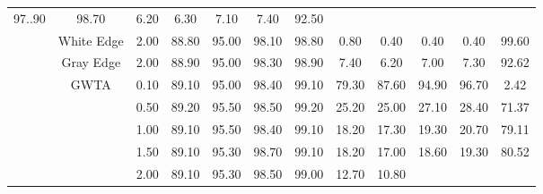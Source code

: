 \begin{table}[htbp]
{\begin{tabular}{cc|c|ccccccccc}
  \multicolumn{1}{c|}{97..90} &
  \multicolumn{1}{c|}{98.70} &
  \multicolumn{1}{c|}{6.20} &
  \multicolumn{1}{c|}{6.30} &
  \multicolumn{1}{c|}{7.10} &
  \multicolumn{1}{c|}{7.40} &
  92.50 \\ \cline{2-12} 
\multicolumn{1}{c|}{} &
  White Edge &
  2.00 &
  \multicolumn{1}{c|}{88.80} &
  \multicolumn{1}{c|}{95.00} &
  \multicolumn{1}{c|}{98.10} &
  \multicolumn{1}{c|}{98.80} &
  \multicolumn{1}{c|}{0.80} &
  \multicolumn{1}{c|}{0.40} &
  \multicolumn{1}{c|}{0.40} &
  \multicolumn{1}{c|}{0.40} &
  99.60 \\ \cline{2-12} 
\multicolumn{1}{c|}{} &
  Gray Edge &
  2.00 &
  \multicolumn{1}{c|}{88.90} &
  \multicolumn{1}{c|}{95.00} &
  \multicolumn{1}{c|}{98.30} &
  \multicolumn{1}{c|}{98.90} &
  \multicolumn{1}{c|}{7.40} &
  \multicolumn{1}{c|}{6.20} &
  \multicolumn{1}{c|}{7.00} &
  \multicolumn{1}{c|}{7.30} &
  92.62 \\ \cline{2-12} 
\multicolumn{1}{c|}{} &
  \multirow{9}{*}{GWTA}&
  0.10 &
  \multicolumn{1}{c|}{89.10} &
  \multicolumn{1}{c|}{95.00} &
  \multicolumn{1}{c|}{98.40} &
  \multicolumn{1}{c|}{99.10} &
  \multicolumn{1}{c|}{79.30} &
  \multicolumn{1}{c|}{87.60} &
  \multicolumn{1}{c|}{94.90} &
  \multicolumn{1}{c|}{96.70} &
  2.42 \\ \cline{3-12} 
\multicolumn{1}{c|}{} &
   &
  0.50 &
  \multicolumn{1}{c|}{89.20} &
  \multicolumn{1}{c|}{95.50} &
  \multicolumn{1}{c|}{98.50} &
  \multicolumn{1}{c|}{99.20} &
  \multicolumn{1}{c|}{25.20} &
  \multicolumn{1}{c|}{25.00} &
  \multicolumn{1}{c|}{27.10} &
  \multicolumn{1}{c|}{28.40} &
  71.37 \\ \cline{3-12} 
\multicolumn{1}{c|}{} &
   &
  1.00 &
  \multicolumn{1}{c|}{89.10} &
  \multicolumn{1}{c|}{95.50} &
  \multicolumn{1}{c|}{98.40} &
  \multicolumn{1}{c|}{99.10} &
  \multicolumn{1}{c|}{18.20} &
  \multicolumn{1}{c|}{17.30} &
  \multicolumn{1}{c|}{19.30} &
  \multicolumn{1}{c|}{20.70} &
  79.11 \\ \cline{3-12} 
\multicolumn{1}{c|}{} &
   &
  1.50 &
  \multicolumn{1}{c|}{89.10} &
  \multicolumn{1}{c|}{95.30} &
  \multicolumn{1}{c|}{98.70} &
  \multicolumn{1}{c|}{99.10} &
  \multicolumn{1}{c|}{18.20} &
  \multicolumn{1}{c|}{17.00} &
  \multicolumn{1}{c|}{18.60} &
  \multicolumn{1}{c|}{19.30} &
  80.52 \\ \cline{3-12} 
\multicolumn{1}{c|}{} &
   &
  2.00 &
  \multicolumn{1}{c|}{89.10} &
  \multicolumn{1}{c|}{95.30} &
  \multicolumn{1}{c|}{98.50} &
  \multicolumn{1}{c|}{99.00} &
  \multicolumn{1}{c|}{12.70} &
  \multicolumn{1}{c|}{10.80} &

\end{tabular}}
\end{table}
